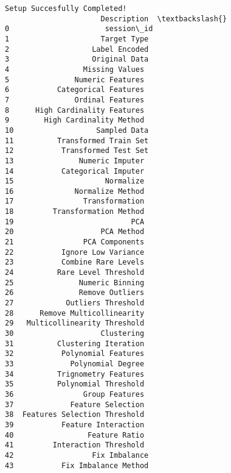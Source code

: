 \documentclass[11pt]{article}
\begin{document}
    \begin{Verbatim}[commandchars=\\\{\}]
Setup Succesfully Completed!
                      Description  \textbackslash{}
0                      session\_id
1                     Target Type
2                   Label Encoded
3                   Original Data
4                 Missing Values
5               Numeric Features
6           Categorical Features
7               Ordinal Features
8      High Cardinality Features
9        High Cardinality Method
10                   Sampled Data
11          Transformed Train Set
12           Transformed Test Set
13               Numeric Imputer
14           Categorical Imputer
15                     Normalize
16              Normalize Method
17                Transformation
18         Transformation Method
19                           PCA
20                    PCA Method
21                PCA Components
22           Ignore Low Variance
23           Combine Rare Levels
24          Rare Level Threshold
25               Numeric Binning
26               Remove Outliers
27            Outliers Threshold
28      Remove Multicollinearity
29   Multicollinearity Threshold
30                    Clustering
31          Clustering Iteration
32           Polynomial Features
33             Polynomial Degree
34          Trignometry Features
35          Polynomial Threshold
36                Group Features
37             Feature Selection
38  Features Selection Threshold
39           Feature Interaction
40                 Feature Ratio
41         Interaction Threshold
42                  Fix Imbalance
43           Fix Imbalance Method


\end{Verbatim}
\end{document}
